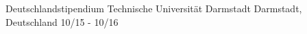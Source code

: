 



\begin{cvhonors}

  \cvhonor
    {Deutschlandstipendium} %
    {Technische Universität Darmstadt} %
    {Darmstadt, Deutschland} %
    {10/15 - 10/16} %

\end{cvhonors}
